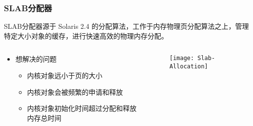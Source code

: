 \begin{frame}[plain,t]    
    \frametitle{SLAB分配器}

    SLAB分配器源于 Solaris 2.4 的分配算法，工作于内存物理页分配算法之上，管理特定大小对象的缓存，进行快速高效的物理内存分配。\pause
    \begin{columns}
        \begin{column}{0.5\textwidth}
          \begin{itemize}
              \item 想解决的问题
              \begin{itemize}
                  \item 内核对象远小于页的大小
                  \item 内核对象会被频繁的申请和释放
                  \item 内核对象初始化时间超过分配和释放内存总时间
              \end{itemize}
          \end{itemize}
        \end{column} \pause
        \begin{column}{0.5\textwidth}
          \begin{figure}
              \centering
              \texttt{[image: Slab-Allocation]}
          \end{figure}
        \end{column}
    \end{columns}
\end{frame}
